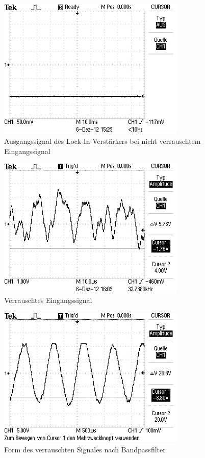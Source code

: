 \begin{figure}
  \centering
  \includegraphics[width=0.8\textwidth]
  {aufnahmen/gleichspannung_ohne_rauschen.jpg}
  \caption{Ausgangssignal des Lock-In-Verstärkers bei nicht verrauschtem
    Eingangssignal}
  \label{fig:gleichspannung_ohne_rausch}
\end{figure}


\begin{figure}
  \centering
  \includegraphics[width=0.8\textwidth]{aufnahmen/vollrausch.jpg}
  \caption{Verrauschtes Eingangssignal}
  \label{fig:vollrausch}
\end{figure}

\begin{figure}
  \centering
  \includegraphics[width=0.8\textwidth]{aufnahmen/bandrausch.jpg}
  \caption{Form des verrauschten Signales nach Bandpassfilter}
  \label{fig:bandrausch}
\end{figure}

